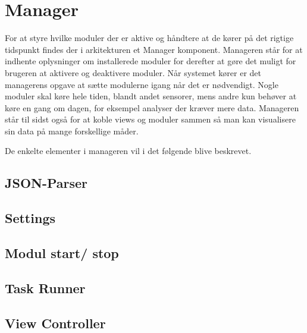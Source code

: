 \section{Manager}

For at styre hvilke moduler der er aktive og håndtere at de kører på det rigtige tidspunkt findes der i arkitekturen et Manager komponent.
Manageren står for at indhente oplysninger om installerede moduler for derefter at gøre det muligt for brugeren at aktivere og deaktivere moduler.
Når systemet kører er det managerens opgave at sætte modulerne igang når det er nødvendigt.
Nogle moduler skal køre hele tiden, blandt andet sensorer, mens andre kun behøver at køre en gang om dagen, for eksempel analyser der kræver mere data.
Manageren står til sidst også for at koble views og moduler sammen så man kan visualisere sin data på mange forskellige måder.

De enkelte elementer i manageren vil i det følgende blive beskrevet.

\subsection{JSON-Parser}

\subsection{Settings}

\subsection{Modul start/ stop}

\subsection{Task Runner}

\subsection{View Controller}
